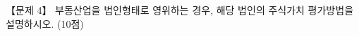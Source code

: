 \begin{longquestion}{【문제 4】}
부동산업을 법인형태로 영위하는 경우, 해당 법인의 주식가치 평가방법을 설명하시오. (10점) \par
\end{longquestion}
